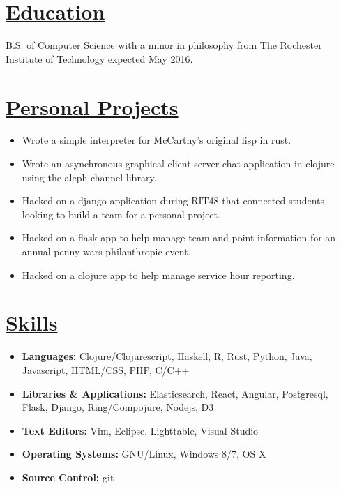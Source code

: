 \documentclass[line,11pt]{res}
\begin{document}
\address{8126 Lakeshore Rd\\ Burtchville, MI\\ 48059}
\address{(810) 304-6041\\ ryan.serazin@gmail.com\\ github.com/esapyr}

\begin{resume}
\begin{multicols}{2}

\section{\underline{\Large Education}}
B.S. of Computer Science with a minor in philosophy from The Rochester Institute of Technology expected May 2016. 

\section{\underline{\Large Personal Projects}}
\begin{itemize}
    \item Wrote a simple interpreter for McCarthy's original lisp in rust.
    \item Wrote an asynchronous graphical client server chat application in clojure using the aleph channel library.
    \item Hacked on a django application during RIT48 that connected students looking to build a team for a personal project. 
    \item Hacked on a flask app to help manage team and point information for an annual penny wars philanthropic event.
    \item Hacked on a clojure app to help manage service hour reporting.
\end{itemize}

\section{\underline{\Large Skills}}
\begin{itemize}
    \item \textbf{Languages:} Clojure/Clojurescript, Haskell, R, Rust, Python, Java, Javascript, HTML/CSS, PHP, C/C++
    \item \textbf{Libraries \& Applications:}  Elasticsearch, React, Angular, Postgresql, Flask, Django, Ring/Compojure, Nodejs, D3
    \item \textbf{Text Editors:} Vim, Eclipse, Lighttable, Visual Studio
    \item \textbf{Operating Systems:} GNU/Linux, Windows 8/7, OS X
    \item \textbf{Source Control:} git
\end{itemize}


\end{multicols}
\end{resume}
\end{document}
